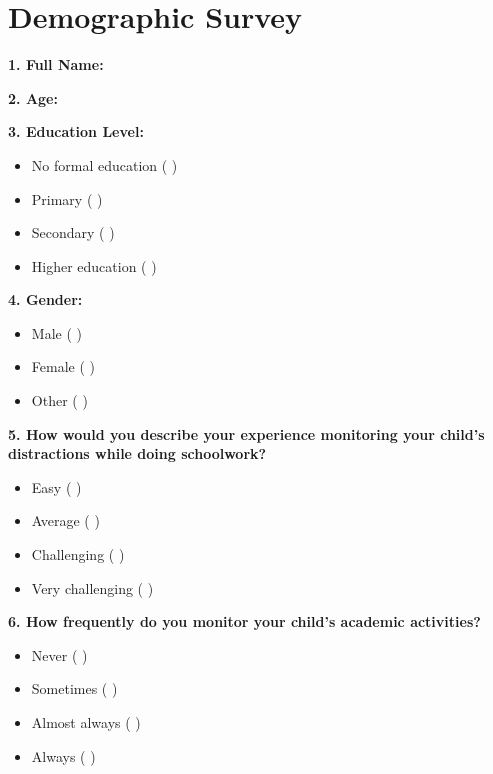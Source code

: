 		
		
	
	\section{Demographic Survey} \label{Appendix:DemographicSurvey}
	\vspace{12pt}
	\noindent
	\textbf{1. Full Name: \hrulefill}
	
	\vspace{12pt}
	\noindent
	\textbf{2. Age: \hrulefill}
	
	\vspace{12pt}
	\noindent				
	\textbf{3. Education Level:}
	
	\begin{itemize}
		\item No formal education ( )
		\item Primary ( )
		\item Secondary ( )
		\item Higher education ( )
	\end{itemize}
	
	\noindent
	\textbf{4. Gender:}
	
	\begin{itemize}
		\item Male ( )
		\item Female ( )
		\item Other ( )
	\end{itemize}
	
	\noindent
	\textbf{5. How would you describe your experience monitoring your child's distractions while doing schoolwork?}
	
	\begin{itemize}
		\item Easy ( )
		\item Average ( )
		\item Challenging ( )
		\item Very challenging ( )
	\end{itemize}
	
	\noindent
	\textbf{6. How frequently do you monitor your child’s academic activities?}
	
	\begin{itemize}
		\item Never ( )
		\item Sometimes ( )
		\item Almost always ( )
		\item Always ( )
	\end{itemize}
	
